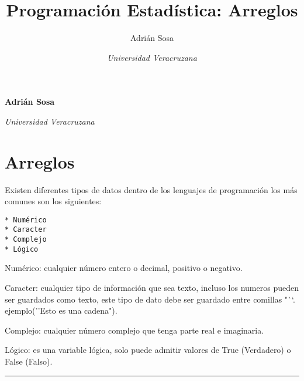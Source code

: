 \documentclass[11pt,]{article}
\title{Programación Estadística: Arreglos  }
\author{\Large Adrián Sosa\vspace{0.05in} \newline\normalsize\emph{}   \and \Large \vspace{0.05in} \newline\normalsize\emph{Universidad Veracruzana}  }
\date{}
\newcommand*{\authorfont}{\fontfamily{phv}\selectfont}
\begin{document}
	
%

{%
\setlength{\parindent}{0pt}
\thispagestyle{plain}
{\fontsize{18}{20}\selectfont\raggedright 
\maketitle  %

}

{
   \vskip 13.5pt\relax \normalsize\fontsize{11}{12} 
\textbf{\authorfont Adrián Sosa} \hskip 15pt \emph{\small }   \par \textbf{\authorfont } \hskip 15pt \emph{\small Universidad Veracruzana}   

}

}






\vskip -8.5pt



\noindent  

\hypertarget{arreglos}{%
\section{Arreglos}\label{arreglos}}

Existen diferentes tipos de datos dentro de los lenguajes de
programación los más comunes son los siguientes:

\begin{verbatim}
* Numérico
* Caracter
* Complejo
* Lógico
\end{verbatim}

Numérico: cualquier número entero o decimal, positivo o negativo.

Caracter: cualquier tipo de información que sea texto, incluso los
numeros pueden ser guardados como texto, este tipo de dato debe ser
guardado entre comillas "``. ejemplo(''Esto es una cadena").

Complejo: cualquier número complejo que tenga parte real e imaginaria.

Lógico: es una variable lógica, solo puede admitir valores de True
(Verdadero) o False (Falso).

\begin{center}\rule{0.5\linewidth}{0.5pt}\end{center}
\end{document}
